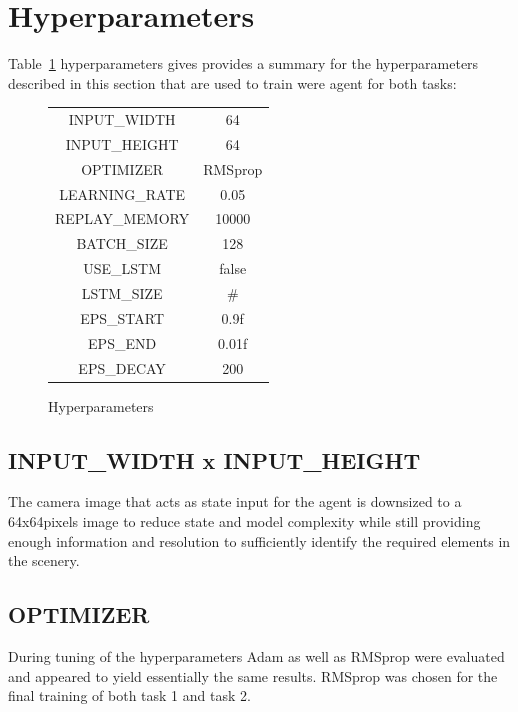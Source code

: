 \documentclass[10pt,journal,compsoc]{IEEEtran}
\begin{document}
\section{Hyperparameters}  
Table~\ref{tab:hyperparameters} hyperparameters gives provides a summary for the hyperparameters described in this section that are used to train were agent for both tasks:
\begin{figure}[thpb]
    \centering
    \begin{tabular}{|c|c|}\hline
        INPUT\_WIDTH  & 64  \\ 
        INPUT\_HEIGHT & 64  \\ 
        OPTIMIZER & RMSprop  \\ 
        LEARNING\_RATE & 0.05 \\ 
        REPLAY\_MEMORY & 10000  \\ 
        BATCH\_SIZE & 128  \\ 
        USE\_LSTM & false  \\ 
        LSTM\_SIZE & \# \\ \hline

        EPS\_START  & 0.9f \\
        EPS\_END  & 0.01f \\
        EPS\_DECAY  & 200 \\
        \hline
    \end{tabular}
    \caption{Hyperparameters}
    \label{tab:hyperparameters}
\end{figure}

\subsection*{INPUT\_WIDTH x INPUT\_HEIGHT} 
The camera image that acts as state input for the agent is downsized to a 64x64pixels image to reduce state and model complexity while still providing enough information and resolution to sufficiently identify the required elements in the scenery.

\subsection*{OPTIMIZER}
During tuning of the hyperparameters Adam as well as RMSprop were evaluated and appeared to yield essentially the same results. RMSprop was chosen for the final training of both task 1 and task 2.
\end{document}
